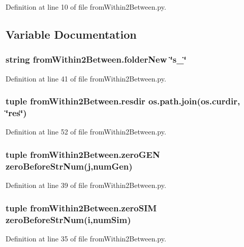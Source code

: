 Definition at line 10 of file from\-Within2\-Between.\-py.



\subsection{Variable Documentation}
\hypertarget{namespacefrom_within2_between_abe0ecb557a225c5832c6567139bf91b4}{
\subsubsection[{folder\-New}]{\setlength{\rightskip}{0pt plus 5cm}string from\-Within2\-Between.\-folder\-New \char`\"{}s\-\_\-\char`\"{}}}\label{namespacefrom_within2_between_abe0ecb557a225c5832c6567139bf91b4}


Definition at line 41 of file from\-Within2\-Between.\-py.

\hypertarget{namespacefrom_within2_between_a47de7eeb1d8dcbb763d1f9db53fe958f}{
\subsubsection[{resdir}]{\setlength{\rightskip}{0pt plus 5cm}tuple from\-Within2\-Between.\-resdir os.\-path.\-join(os.\-curdir, \char`\"{}res\char`\"{})}}\label{namespacefrom_within2_between_a47de7eeb1d8dcbb763d1f9db53fe958f}


Definition at line 52 of file from\-Within2\-Between.\-py.

\hypertarget{namespacefrom_within2_between_a1cd31aebf09d421ec4c6ef89fa122662}{
\subsubsection[{zero\-G\-E\-N}]{\setlength{\rightskip}{0pt plus 5cm}tuple from\-Within2\-Between.\-zero\-G\-E\-N {\bf zero\-Before\-Str\-Num}({\bf j},num\-Gen)}}\label{namespacefrom_within2_between_a1cd31aebf09d421ec4c6ef89fa122662}


Definition at line 39 of file from\-Within2\-Between.\-py.

\hypertarget{namespacefrom_within2_between_a0f4d3ac33db22359da335b2db8cece7f}{
\subsubsection[{zero\-S\-I\-M}]{\setlength{\rightskip}{0pt plus 5cm}tuple from\-Within2\-Between.\-zero\-S\-I\-M {\bf zero\-Before\-Str\-Num}({\bf i},num\-Sim)}}\label{namespacefrom_within2_between_a0f4d3ac33db22359da335b2db8cece7f}


Definition at line 35 of file from\-Within2\-Between.\-py.

